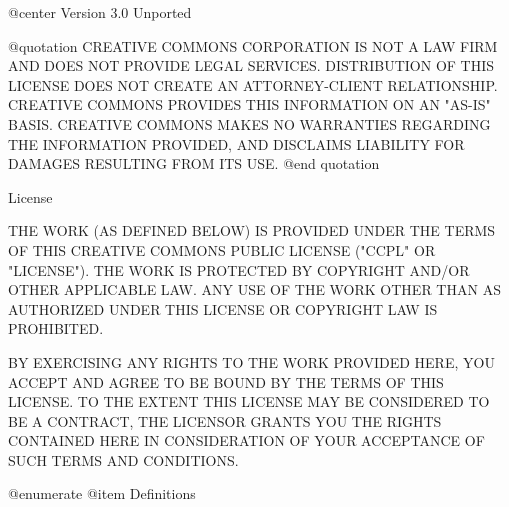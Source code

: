 @center Version 3.0 Unported

@quotation
CREATIVE COMMONS CORPORATION IS NOT A LAW FIRM AND DOES NOT PROVIDE LEGAL SERVICES. DISTRIBUTION OF THIS LICENSE DOES NOT CREATE AN ATTORNEY-CLIENT RELATIONSHIP. CREATIVE COMMONS PROVIDES THIS INFORMATION ON AN "AS-IS" BASIS. CREATIVE COMMONS MAKES NO WARRANTIES REGARDING THE INFORMATION PROVIDED, AND DISCLAIMS LIABILITY FOR DAMAGES RESULTING FROM ITS USE.
@end quotation

License

THE WORK (AS DEFINED BELOW) IS PROVIDED UNDER THE TERMS OF THIS CREATIVE COMMONS PUBLIC LICENSE ("CCPL" OR "LICENSE"). THE WORK IS PROTECTED BY COPYRIGHT AND/OR OTHER APPLICABLE LAW. ANY USE OF THE WORK OTHER THAN AS AUTHORIZED UNDER THIS LICENSE OR COPYRIGHT LAW IS PROHIBITED.

BY EXERCISING ANY RIGHTS TO THE WORK PROVIDED HERE, YOU ACCEPT AND AGREE TO BE BOUND BY THE TERMS OF THIS LICENSE. TO THE EXTENT THIS LICENSE MAY BE CONSIDERED TO BE A CONTRACT, THE LICENSOR GRANTS YOU THE RIGHTS CONTAINED HERE IN CONSIDERATION OF YOUR ACCEPTANCE OF SUCH TERMS AND CONDITIONS.

@enumerate
@item
Definitions

